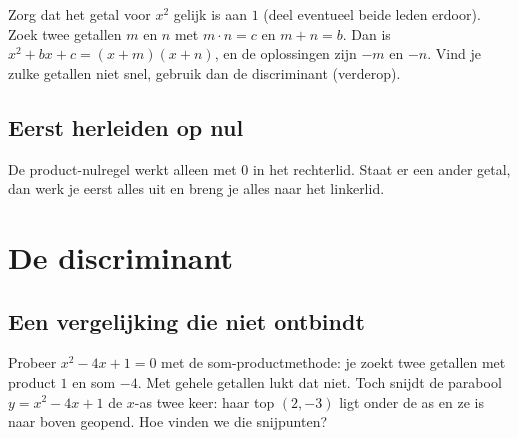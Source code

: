 \begin{werkwijze}
Zorg dat het getal voor $x^2$ gelijk is aan $1$ (deel eventueel beide leden erdoor). Zoek twee getallen $m$ en $n$ met $m \cdot n = c$ en $m + n = b$. Dan is $x^2 + bx + c = (x + m)(x + n)$, en de oplossingen zijn $-m$ en $-n$. Vind je zulke getallen niet snel, gebruik dan de discriminant (verderop).
\end{werkwijze}

\begin{oefeningen}
\end{oefeningen}

\subsection{Eerst herleiden op nul}

De product-nulregel werkt alleen met $0$ in het rechterlid. Staat er een ander getal, dan werk je eerst alles uit en breng je alles naar het linkerlid.


\begin{oefeningen}
\end{oefeningen}

\section{De discriminant}

\subsection{Een vergelijking die niet ontbindt}

Probeer $x^2 - 4x + 1 = 0$ met de som-productmethode: je zoekt twee getallen met product $1$ en som $-4$. Met gehele getallen lukt dat niet. Toch snijdt de parabool $y = x^2 - 4x + 1$ de $x$-as twee keer: haar top $(2, -3)$ ligt onder de as en ze is naar boven geopend. Hoe vinden we die snijpunten?

